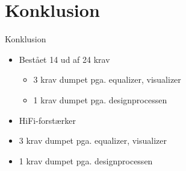 \section{Konklusion}
\begin{frame}{Konklusion}

\begin{itemize}
\item<1-> Bestået 14 ud af 24 krav
\begin{itemize}
\item<1-> 3 krav dumpet pga. equalizer, visualizer
\item<1-> 1 krav dumpet pga. designprocessen
\end{itemize}
\item<2-2> \textcolor{light-gray}{HiFi-}forstærker
\item<2-> 3 krav dumpet pga. equalizer, visualizer
\item<2-> 1 krav dumpet pga. designprocessen
\end{itemize}

\end{frame}

